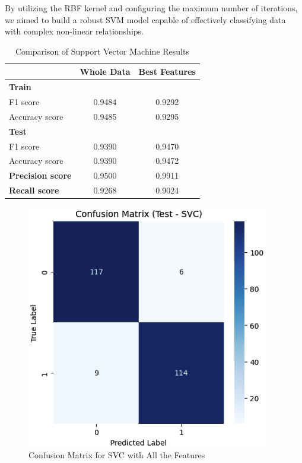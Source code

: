 \documentclass[conference]{IEEEtran}
\begin{document}
By utilizing the RBF kernel and configuring the maximum number of iterations, we aimed to build a robust SVM model capable of effectively classifying data with complex non-linear relationships.

\begin{table}[htbp]
\centering
\begin{tabular}{@{}lcc@{}}
\toprule
 & \textbf{Whole Data} & \textbf{Best Features} \\ \midrule
\textbf{Train} &  &  \\
\quad F1 score & 0.9484 & 0.9292 \\
\quad Accuracy score & 0.9485 & 0.9295 \\
\textbf{Test} &  &  \\
\quad F1 score & 0.9390 & 0.9470 \\
\quad Accuracy score & 0.9390 & 0.9472 \\
\textbf{Precision score} & 0.9500 & 0.9911 \\
\textbf{Recall score} & 0.9268 & 0.9024 \\ \bottomrule
\end{tabular}
\caption{Comparison of Support Vector Machine Results}
\label{tab:svm-comparison}
\end{table}

\begin{figure}[H]
    \centering
    \includegraphics[width=1\linewidth]{images/ConfusionMatrixSVCAllFeatures.png}
    \caption{Confusion Matrix for SVC with All the Features}
    \label{fig:Confusion-SVC-Best}
\end{figure}
\end{document}

